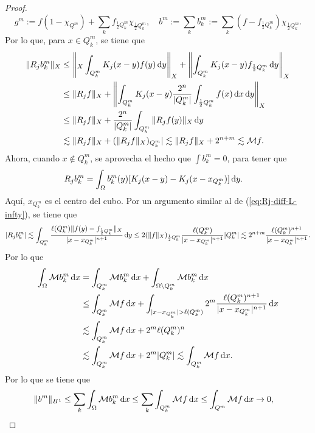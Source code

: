 \begin{proof}
\begin{equation*}
		g^m := f(1-\chi_{Q^m}) + \sum_k f_{\frac{1}{2}Q_k^m}\chi_{\frac{1}{2}Q_k^m}, \quad b^m := \sum_k b_k^m := \sum_k (f-f_{\frac{1}{2}Q_k^m})\chi_{\frac{1}{2}Q_k^m}.
	\end{equation*}
	Por lo que, para $x\in Q_k^m$, se tiene que 
	\begin{align*}
		\|R_jb_k^m\|_X & \leq \left\|_X \int_{Q_k^m} K_j(x-y)f(y) \mathop{}\!\mathrm{d} y \right\|_X +\left\| \int_{Q_k^m} K_j(x-y)f_{\frac{1}{2}Q_k^m} \mathop{}\!\mathrm{d} y \right\|_X\\
		& \leq \|R_jf\|_X +\left\| \int_{Q_k^m} K_j(x-y)\frac{2^n}{|Q_k^m|}\int_{\frac{1}{2}Q_k^m}f(x)\mathop{}\!\mathrm{d} x \mathop{}\!\mathrm{d} y \right\|_X \\
		& \leq \|R_jf\|_X +\frac{2^n}{|Q_k^m|} \int_{Q_k^m} \|R_jf(y)\|_X \mathop{}\!\mathrm{d} y  \\
		& \lesssim \|R_jf\|_X  + (\|R_jf\|_X)_{Q_k^m}| \lesssim \|R_jf\|_X + 2^{n+m} \lesssim \mathcal{M}f.
	\end{align*}
	Ahora, cuando $x\notin Q_k^m$, se aprovecha el hecho que $\int b_k^m = 0$, para tener que 
	\begin{align*}
		R_jb_k^m&=  \int_{\Omega} b_k^m(y)[K_j(x-y) - K_j(x-x_{Q_k^m} )] \mathop{}\!\mathrm{d} y.
	\end{align*}
	Aquí, $x_{Q_k^m}$ es el centro del cubo. Por un argumento similar al de (\ref{eq:Rj-diff-L-infty}), se tiene que 
	\begin{equation*}
		| R_jb_k^m |\lesssim \int_{Q_k^m} \frac{\ell(Q_k^m)\|f(y) - f_{\frac{1}{2}Q_k^m}\|_X}{|x-x_{Q_k^m}|^{n+1}} \mathop{}\!\mathrm{d} y \leq 2(\|f\|_X)_{\frac{1}{2}Q_k^m} \frac{\ell(Q_k^m)}{|x-x_{Q_k^m}|^{n+1}}|Q_k^m| \lesssim 2^{n+m}\frac{\ell(Q_k^m)^{n+1}}{|x-x_{Q_k^m}|^{n+1}}.
	\end{equation*}
	Por lo que 
	\begin{align*}
		\int_{\Omega}\mathcal{M}{b_k^m} \diff x &= \int_{Q_k^m}\mathcal{M}{b_k^m} \diff x + \int_{\Omega\setminus Q_k^m}\mathcal{M}{b_k^m} \diff x\\
		& \leq \int_{Q_k^m}\mathcal{M}f \diff x + \int_{|x-x_{Q_k^m}|>\ell(Q_k^m)} 2^{m}\frac{\ell(Q_k^m)^{n+1}}{|x-x_{Q_k^m}|^{n+1}} \diff x \\
		& \lesssim  \int_{Q_k^m}\mathcal{M}f \diff x + 2^m\ell(Q_k^m)^n\\
		 & \lesssim  \int_{Q_k^m}\mathcal{M}f \diff x + 2^m|Q_k^m| \lesssim  \int_{Q_k^m}\mathcal{M}f \diff x .
	\end{align*}
	Por lo que se tiene que 
	\begin{align*}
		\|b^m\|_{H^1} & \leq \sum_k	\int_{\Omega}\mathcal{M}{b_k^m} \diff x \leq \sum_k \int_{Q_k^m} \mathcal{M}f\diff x \leq \int_{Q^m}\mathcal{M}f\diff x \to 0,

\end{align*}
\end{proof}
